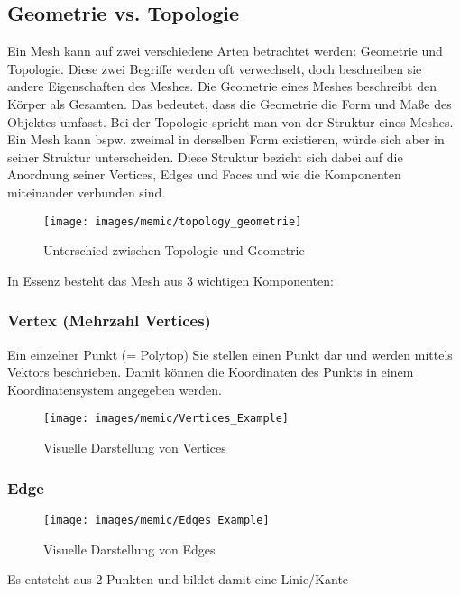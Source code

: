 \subsection{Geometrie vs. Topologie}

Ein Mesh kann auf zwei verschiedene Arten betrachtet werden: Geometrie und Topologie. Diese zwei Begriffe werden oft verwechselt, doch beschreiben sie andere Eigenschaften des Meshes. Die Geometrie eines Meshes beschreibt den Körper als Gesamten. Das bedeutet, dass die Geometrie die Form und Maße des Objektes umfasst. Bei der Topologie spricht man von der Struktur eines Meshes. Ein Mesh kann bspw. zweimal in derselben Form existieren, würde sich aber in seiner Struktur unterscheiden. Diese Struktur bezieht sich dabei auf die Anordnung seiner Vertices, Edges und Faces und wie die Komponenten miteinander verbunden sind.

\begin{figure}[H]
	\centering
	\texttt{[image: images/memic/topology\_geometrie]}
	\caption{Unterschied zwischen Topologie und Geometrie\cite{_geoTopo}}
\end{figure} 

In Essenz besteht das Mesh aus 3 wichtigen Komponenten\cite[2]{_highpoly_to_lowpoly}:

\subsubsection{Vertex (Mehrzahl Vertices)}

Ein einzelner Punkt (= Polytop)
Sie stellen einen Punkt dar und werden mittels Vektors beschrieben. Damit können die Koordinaten des Punkts in einem Koordinatensystem angegeben werden.\cite[S.47]{_the_essential_guide_to_3D}

\begin{figure}[H]
	\centering
	\texttt{[image: images/memic/Vertices\_Example]}
	\caption{Visuelle Darstellung von Vertices}
\end{figure}

\subsubsection{Edge}

\begin{figure}[H]
	\centering
	\texttt{[image: images/memic/Edges\_Example]}
	\caption{Visuelle Darstellung von Edges}
\end{figure}

Es entsteht aus 2 Punkten und bildet damit eine Linie/Kante


